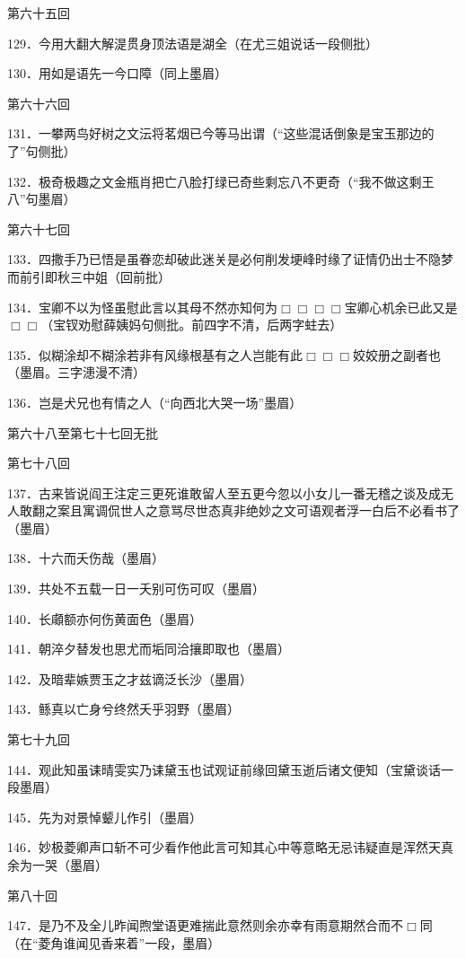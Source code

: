 第六十五回

129．今用大翻大解湜贯身顶法语是湖全{（\kaishu 在尤三姐说话一段侧批）}

130．用如是语先一今口障{（\kaishu 同上墨眉）}

第六十六回

131．一攀两鸟好树之文沄将茗烟已今等马出谓{（\kaishu “这些混话倒象是宝玉那边的了”句侧批）}

132．极奇极趣之文金瓶肖把亡八脸打绿已奇些剩忘八不更奇{（\kaishu “我不做这剩王八”句墨眉）}

第六十七回

133．四撒手乃已悟是虽眷恋却破此迷关是必何削发埂峰时缘了证情仍出士不隐梦而前引即秋三中姐{（\kaishu 回前批）}

134．宝卿不以为怪虽慰此言以其母不然亦知何为{$\Box\Box\Box\Box$}宝卿心机余已此又是{$\Box\Box$}{（\kaishu 宝钗劝慰薛姨妈句侧批。前四字不清，后两字蛀去）}

135．似糊涂却不糊涂若非有风缘根基有之人岂能有此{$\Box\Box\Box$}姣姣册之副者也{（\kaishu 墨眉。三字漶漫不清）}

136．岂是犬兄也有情之人{（\kaishu “向西北大哭一场”墨眉）}

第六十八至第七十七回无批

第七十八回

137．古来皆说阎王注定三更死谁敢留人至五更今忽以小女儿一番无稽之谈及成无人敢翻之案且寓调侃世人之意骂尽世态真非绝妙之文可语观者浮一白后不必看书了{（\kaishu 墨眉）}

138．十六而夭伤哉{（\kaishu 墨眉）}

139．共处不五载一日一夭别可伤可叹{（\kaishu 墨眉）}

140．长顑额亦何伤黄面色{（\kaishu 墨眉）}

141．朝淬夕替发也思尤而垢同洽攘即取也{（\kaishu 墨眉）}

142．及暗辈嫉贾玉之才兹谪泛长沙{（\kaishu 墨眉）}

143．鲧真以亡身兮终然夭乎羽野{（\kaishu 墨眉）}

第七十九回

144．观此知虽诔晴雯实乃诔黛玉也试观证前缘回黛玉逝后诸文便知{（\kaishu 宝黛谈话一段墨眉）}

145．先为对景悼颦儿作引{（\kaishu 墨眉）}

146．妙极菱卿声口斩不可少看作他此言可知其心中等意略无忌讳疑直是浑然天真余为一哭{（\kaishu 墨眉）}

第八十回

147．是乃不及全儿昨闻煦堂语更难揣此意然则余亦幸有雨意期然合而不{$\Box$}同{（\kaishu 在“菱角谁闻见香来着”一段，墨眉）}

